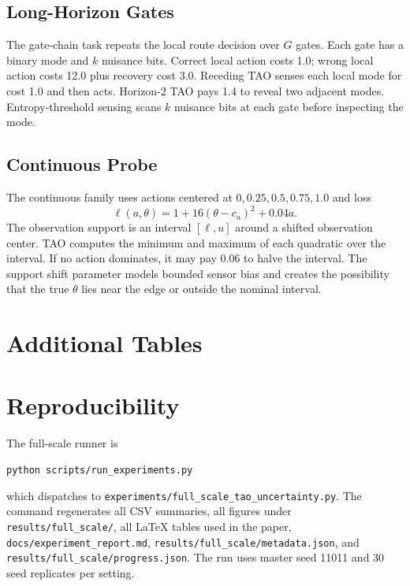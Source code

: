 \documentclass{article}
\newcommand{\loss}{\ell}
\begin{document}
\subsection{Long-Horizon Gates}

The gate-chain task repeats the local route decision over $G$ gates. Each gate has a binary mode and $k$ nuisance bits. Correct local action costs 1.0; wrong local action costs 12.0 plus recovery cost 3.0. Receding TAO senses each local mode for cost 1.0 and then acts. Horizon-2 TAO pays 1.4 to reveal two adjacent modes. Entropy-threshold sensing scans $k$ nuisance bits at each gate before inspecting the mode.

\subsection{Continuous Probe}

The continuous family uses actions centered at $0,0.25,0.5,0.75,1.0$ and loss
\begin{equation}
  \loss(a,\theta) = 1 + 16(\theta-c_a)^2 + 0.04a.
\end{equation}
The observation support is an interval $[\ell,u]$ around a shifted observation center. TAO computes the minimum and maximum of each quadratic over the interval. If no action dominates, it may pay 0.06 to halve the interval. The support shift parameter models bounded sensor bias and creates the possibility that the true $\theta$ lies near the edge or outside the nominal interval.

\section{Additional Tables}

\begin{table}[h]
  \centering
  \caption{Claim-to-evidence map used for the final audit.}
  \label{tab:claim-evidence}
  \resizebox{\linewidth}{!}{}
\end{table}

\section{Reproducibility}

The full-scale runner is
\begin{center}
\texttt{python scripts/run\_experiments.py}
\end{center}
which dispatches to \texttt{experiments/full\_scale\_tao\_uncertainty.py}. The command regenerates all CSV summaries, all figures under \texttt{results/full\_scale/}, all LaTeX tables used in the paper, \texttt{docs/experiment\_report.md}, \texttt{results/full\_scale/metadata.json}, and \texttt{results/full\_scale/progress.json}. The run uses master seed 11011 and 30 seed replicates per setting.
\end{document}
